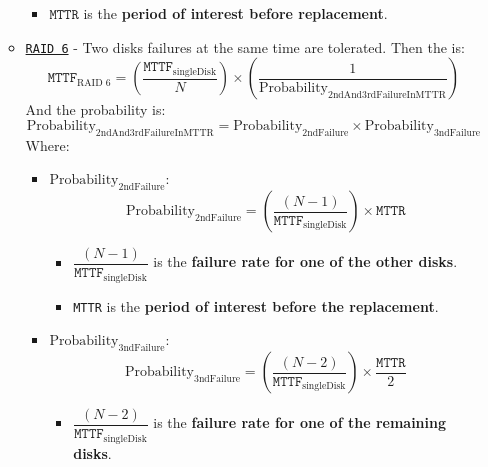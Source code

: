 \begin{itemize}
\begin{itemize}
\begin{itemize}
            \item $\texttt{MTTR}$ is the \textbf{period of interest before replacement}.
        \end{itemize}


        \item \texttt{\underline{RAID 6}} - Two disks failures at the same time are tolerated. Then the  is:
        \begin{equation}
            \texttt{MTTF}_{\text{RAID 6}} = \left(
                \dfrac{\texttt{MTTF}_{\text{singleDisk}}}{N}
            \right) \times \left(
                \dfrac{1}{\text{Probability}_{\text{2ndAnd3rdFailureInMTTR}}}
            \right)
        \end{equation}
        And the probability is:
        \begin{equation}
            \text{Probability}_{\text{2ndAnd3rdFailureInMTTR}} = \text{Probability}_{\text{2ndFailure}} \times \text{Probability}_{\text{3ndFailure}}
        \end{equation}
        Where:
        \begin{itemize}
            \item $\text{Probability}_{\text{2ndFailure}}$:
            \begin{equation}
                \text{Probability}_{\text{2ndFailure}} = \left(\dfrac{\left(N-1\right)}{\texttt{MTTF}_{\text{singleDisk}}}\right) \times \texttt{MTTR}
            \end{equation}
            \begin{itemize}
                \item $\dfrac{\left(N-1\right)}{\texttt{MTTF}_{\text{singleDisk}}}$ is the \textbf{failure rate for one of the other disks}.

                \item \texttt{MTTR} is the \textbf{period of interest before the replacement}.
            \end{itemize}

            \item $\text{Probability}_{\text{3ndFailure}}$:
            \begin{equation}
                \text{Probability}_{\text{3ndFailure}} = \left(\dfrac{\left(N-2\right)}{\texttt{MTTF}_{\text{singleDisk}}}\right) \times \dfrac{\texttt{MTTR}}{2}
            \end{equation}
            \begin{itemize}
                \item $\dfrac{\left(N-2\right)}{\texttt{MTTF}_{\text{singleDisk}}}$ is the \textbf{failure rate for one of the remaining disks}.\vspace{.5em}


\end{itemize}
\end{itemize}
\end{itemize}
\end{itemize}
